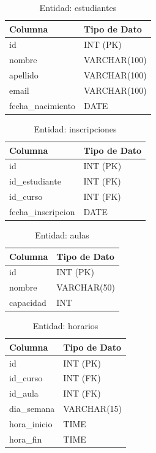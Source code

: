 \documentclass[12pt,letterpaper]{article}
\begin{document}
\begin{table}[H]
    \centering
    \begin{tabular}{|l|l|}
    \hline
    \textbf{Columna} & \textbf{Tipo de Dato} \\ \hline
    id & INT (PK) \\ 
    nombre & VARCHAR(100) \\ 
    apellido & VARCHAR(100) \\ 
    email & VARCHAR(100) \\ 
    fecha\_nacimiento & DATE \\ \hline
    \end{tabular}
    \caption{Entidad: estudiantes}
\end{table}

\begin{table}[H]
    \centering
    \begin{tabular}{|l|l|}
    \hline
    \textbf{Columna} & \textbf{Tipo de Dato} \\ \hline
    id & INT (PK) \\ 
    id\_estudiante & INT (FK) \\ 
    id\_curso & INT (FK) \\ 
    fecha\_inscripcion & DATE \\ \hline
    \end{tabular}
    \caption{Entidad: inscripciones}
\end{table}

\begin{table}[H]
    \centering
    \begin{tabular}{|l|l|}
    \hline
    \textbf{Columna} & \textbf{Tipo de Dato} \\ \hline
    id & INT (PK) \\ 
    nombre & VARCHAR(50) \\ 
    capacidad & INT \\ \hline
    \end{tabular}
    \caption{Entidad: aulas}
\end{table}

\begin{table}[H]
    \centering
    \begin{tabular}{|l|l|}
    \hline
    \textbf{Columna} & \textbf{Tipo de Dato} \\ \hline
    id & INT (PK) \\ 
    id\_curso & INT (FK) \\ 
    id\_aula & INT (FK) \\ 
    dia\_semana & VARCHAR(15) \\ 
    hora\_inicio & TIME \\ 
    hora\_fin & TIME \\ \hline
    \end{tabular}
    \caption{Entidad: horarios}
\end{table}
\end{document}
